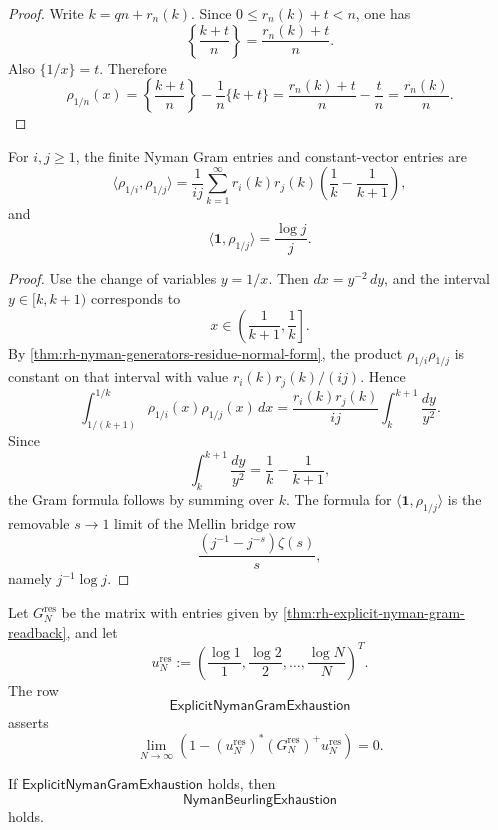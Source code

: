 \begin{proof}
Write $k=qn+r_n(k)$.  Since $0\le r_n(k)+t<n$, one has
$$
\left\{\frac{k+t}{n}\right\}
=
\frac{r_n(k)+t}{n}.
$$
Also $\{1/x\}=t$.  Therefore
$$
\rho_{1/n}(x)
=
\left\{\frac{k+t}{n}\right\}
-
\frac{1}{n}\{k+t\}
=
\frac{r_n(k)+t}{n}-\frac{t}{n}
=
\frac{r_n(k)}{n}.
$$
\end{proof}

\begin{theorem}
\label{thm:rh-explicit-nyman-gram-readback}
For $i,j\ge1$, the finite Nyman Gram entries and constant-vector entries
are
$$
\langle \rho_{1/i},\rho_{1/j}\rangle
=
\frac{1}{ij}
\sum_{k=1}^{\infty}
r_i(k)r_j(k)
\left(
\frac{1}{k}-\frac{1}{k+1}
\right),
$$
and
$$
\langle \mathbf 1,\rho_{1/j}\rangle
=
\frac{\log j}{j}.
$$
\end{theorem}

\begin{proof}
Use the change of variables $y=1/x$.  Then $dx=y^{-2}\,dy$, and the
interval $y\in[k,k+1)$ corresponds to
$$
x\in\left(\frac{1}{k+1},\frac{1}{k}\right].
$$
By \autoref{thm:rh-nyman-generators-residue-normal-form}, the product
$\rho_{1/i}\rho_{1/j}$ is constant on that interval with value
$r_i(k)r_j(k)/(ij)$.  Hence
$$
\int_{1/(k+1)}^{1/k}\rho_{1/i}(x)\rho_{1/j}(x)\,dx
=
\frac{r_i(k)r_j(k)}{ij}
\int_k^{k+1}\frac{dy}{y^2}.
$$
Since
$$
\int_k^{k+1}\frac{dy}{y^2}
=
\frac{1}{k}-\frac{1}{k+1},
$$
the Gram formula follows by summing over $k$.  The formula for
$\langle\mathbf 1,\rho_{1/j}\rangle$ is the removable $s\to1$ limit of
the Mellin bridge row
$$
\frac{(j^{-1}-j^{-s})\zeta(s)}{s},
$$
namely $j^{-1}\log j$.
\end{proof}

\begin{definition}
\label{def:rh-explicit-nyman-gram-exhaustion}
Let $G_N^{\mathrm{res}}$ be the matrix with entries given by
\autoref{thm:rh-explicit-nyman-gram-readback}, and let
$$
u_N^{\mathrm{res}}
:=
\left(
\frac{\log 1}{1},
\frac{\log 2}{2},
\ldots,
\frac{\log N}{N}
\right)^T.
$$
The row
$$
\mathsf{ExplicitNymanGramExhaustion}
$$
asserts
$$
\lim_{N\to\infty}
\left(
1-(u_N^{\mathrm{res}})^\ast
(G_N^{\mathrm{res}})^+
u_N^{\mathrm{res}}
\right)
=0.
$$
\end{definition}

\begin{theorem}
\label{thm:rh-explicit-nyman-gram-exhaustion-gives-nyman-exhaustion}
If $\mathsf{ExplicitNymanGramExhaustion}$ holds, then
$$
\mathsf{NymanBeurlingExhaustion}
$$
holds.
\end{theorem}


